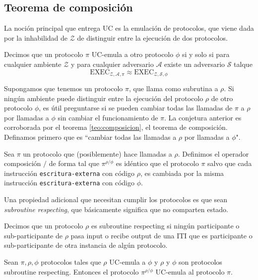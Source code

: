 \subsection{Teorema de composición}

La noción principal que entrega UC es la emulación de protocolos, que viene dada por la inhabilidad de
$\mathcal{Z}$ de distinguir entre la ejecución de dos protocolos.

\begin{definicion}
Decimos que un protocolo $\pi$ UC-emula a otro protocolo $\phi$ si y solo si para cualquier ambiente
$\mathcal{Z}$ y para cualquier adversario $\mathcal{A}$ existe un adversario $\mathcal{S}$ talque
$$\mathrm{EXEC}_{\mathcal{Z}, \mathcal{A}, \pi} \approx \mathrm{EXEC}_{\mathcal{Z}, \mathcal{S}, \phi}$$
\end{definicion}

Supongamos que tenemos un protocolo $\pi$, que llama como subrutina a $\rho$. Si ningún ambiente puede
distinguir entre la ejecución del protocolo $\rho$ de otro protocolo $\phi$, es útil preguntarse si se pueden
cambiar todas las llamadas de $\pi$ a $\rho$ por llamadas a $\phi$ sin cambiar el funcionamiento de
$\pi$. La conjetura anterior es corroborada por el teorema \ref{teo:composicion}, el teorema de composición.
Definamos primero que es ``cambiar todas las llamadas a $\rho$ por llamadas a $\phi$".

\begin{definicion}
Sea $\pi$ un protocolo que (posiblemente) hace llamadas a $\rho$. Definimos el operador composición $/$ de forma tal
que $\pi^{\rho/\phi}$ es idéntico que el protocolo $\pi$ salvo que cada instrucción \texttt{escritura-externa}
con código $\rho$, es cambiada por la misma instrucción \texttt{escritura-externa} con código $\phi$.
\end{definicion}

Una propiedad adicional que necesitan cumplir los protocolos es que sean \textit{subroutine respecting}, que
básicamente significa que no comparten estado.

\begin{definicion}
Decimos que un protocolo $\rho$ es subroutine respecting si ningún participante o sub-participante de $\rho$
pasa input o recibe output de una ITI que es participante o sub-participante de otra instancia de algún
protocolo.
\end{definicion}

\begin{teorema}[Composición]
Sean $\pi, \rho, \phi$ protocolos tales que $\rho$ UC-emula a $\phi$ y $\rho$ y $\phi$ son protocolos
subroutine respecting. Entonces el protocolo $\pi^{\rho/\phi}$ UC-emula al protocolo $\pi$.
\label{teo:composicion}
\end{teorema}

